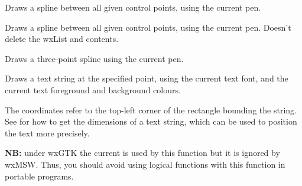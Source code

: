 \label{wxdcdrawspline}


Draws a spline between all given control points, using the current
pen.


Draws a spline between all given control points, using the current
pen.  Doesn't delete the wxList and contents.


Draws a three-point spline using the current pen.




\label{wxdcdrawtext}


Draws a text string at the specified point, using the current text font,
and the current text foreground and background colours.

The coordinates refer to the top-left corner of the rectangle bounding
the string. See  for how
to get the dimensions of a text string, which can be used to position the
text more precisely.

{\bf NB:} under wxGTK the current 
 is used by this function
but it is ignored by wxMSW. Thus, you should avoid using logical functions
with this function in portable programs.

\begin{comment}

\membersection{wxDC::EnableCache}\label{wxdcenablecache}

\func{static void}{EnableCache}{\param{bool}{ enableCache}}

On supported platforms (currently only Windows), enables the DC cache
which can speed up the \helpref{Blit}{wxdcblit} operation when
drawing a large number of masked bitmaps.

If using the cache functions in your code, please test for the
wxUSE\_DC\_CACHEING preprocessor symbol for portability.

\wxheading{See also}

\helpref{wxDC::CacheEnabled}{wxdccacheenabled}, \helpref{wxDC::ClearCache}
\end{comment}


